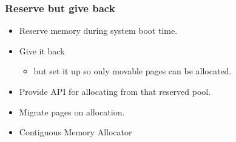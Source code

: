 \begin{frame}
  \frametitle{Reserve but give back}

  \begin{itemize}
  \item Reserve memory during system boot time.
  \item Give it back
    \begin{itemize}
    \item but set it up so only movable pages can be allocated.
    \end{itemize}
  \item Provide API for allocating from that reserved pool.
  \item Migrate pages on allocation.
  \end{itemize}

  \begin{itemize}
  \item Contiguous Memory Allocator
  \end{itemize}
\end{frame}
